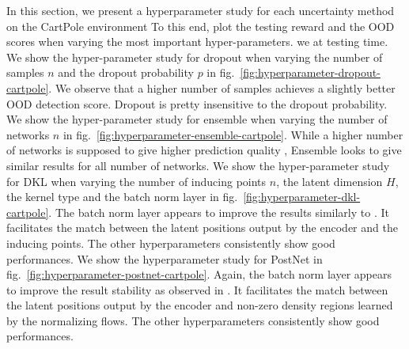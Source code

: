 In this section, we present a hyperparameter study for each uncertainty method on the CartPole environment To this end, plot the testing reward and the OOD scores when varying the most important hyper-parameters. we at testing time. We show the hyper-parameter study for dropout when varying the number of samples $n$ and the dropout probability $p$ in fig.~\ref{fig:hyperparameter-dropout-cartpole}. We observe that a higher number of samples achieves a slightly better OOD detection score. Dropout is pretty insensitive to the dropout probability. We show the hyper-parameter study for ensemble when varying the number of networks $n$ in fig.~\ref{fig:hyperparameter-ensemble-cartpole}. While a higher number of networks is supposed to give higher prediction quality \cite{ensembles}, Ensemble looks to give similar results for all number of networks. We show the hyper-parameter study for DKL when varying the number of inducing points $n$, the latent dimension $H$, the kernel type and the batch norm layer in fig.~\ref{fig:hyperparameter-dkl-cartpole}. The batch norm layer appears to improve the results similarly to \cite{postnet}. It facilitates the match between the latent positions output by the encoder and the inducing points. The other hyperparameters consistently show good performances. We show the hyperparameter study for PostNet in fig.~\ref{fig:hyperparameter-postnet-cartpole}. Again, the batch norm layer appears to improve the result stability as observed in \cite{postnet}. It facilitates the match between the latent positions output by the encoder and non-zero density regions learned by the normalizing flows. The other hyperparameters consistently show good performances.




